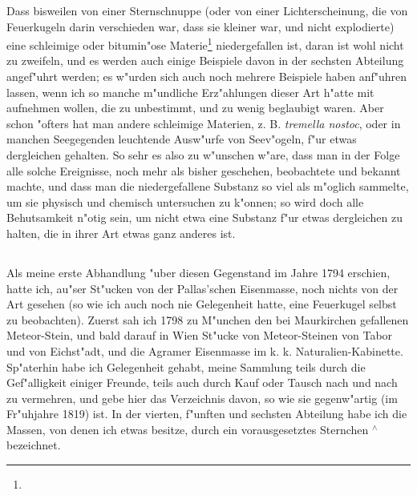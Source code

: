 \documentclass[a4paper, 11pt, oneside, polutonikogreek, german]{article}
\begin{document}
Dass bisweilen von einer Sternschnuppe (oder von einer Lichterscheinung, die von Feuerkugeln darin verschieden war, dass sie kleiner war, und nicht explodierte) eine schleimige oder bitumin"ose Materie\footnote{} niedergefallen ist, daran ist wohl nicht zu zweifeln, und es werden auch einige Beispiele davon in der sechsten Abteilung angef"uhrt werden; es w"urden sich auch noch mehrere Beispiele haben anf"uhren lassen, wenn ich so manche m"undliche Erz"ahlungen dieser Art h"atte mit aufnehmen wollen, die zu unbestimmt, und zu wenig beglaubigt waren. Aber schon "ofters hat man andere schleimige Materien, z. B. \emph{tremella nostoc}, oder in manchen Seegegenden leuchtende Ausw"urfe von Seev"ogeln, f"ur etwas dergleichen gehalten. So sehr es also zu w"unschen w"are, dass man in der Folge alle solche Ereignisse, noch mehr als bisher geschehen, beobachtete und bekannt machte, und dass man die niedergefallene Substanz so viel als m"oglich sammelte, um sie physisch und chemisch untersuchen zu k"onnen; so wird doch alle Behutsamkeit n"otig sein, um nicht etwa eine Substanz f"ur etwas dergleichen zu halten, die in ihrer Art etwas ganz anderes ist.
\subsection{}
\paragraph{}
Als meine erste Abhandlung "uber diesen Gegenstand im Jahre 1794 erschien, hatte ich, au"ser St"ucken von der Pallas'schen Eisenmasse, noch nichts von der Art gesehen (so wie ich auch noch nie Gelegenheit hatte, eine Feuerkugel selbst zu beobachten). Zuerst sah ich 1798 zu M"unchen den bei Maurkirchen gefallenen Meteor-Stein, und bald darauf in Wien St"ucke von Meteor-Steinen von Tabor und von Eichst"adt, und die Agramer Eisenmasse im k. k. Naturalien-Kabinette. Sp"aterhin habe ich Gelegenheit gehabt, meine Sammlung teils durch die Gef"alligkeit einiger Freunde, teils auch durch Kauf oder Tausch nach und nach zu vermehren, und gebe hier das Verzeichnis davon, so wie sie gegenw"artig (im Fr"uhjahre 1819) ist. In der vierten, f"unften und sechsten Abteilung habe ich die Massen, von denen ich etwas besitze, durch ein vorausgesetztes Sternchen $^\wedge$ bezeichnet.
\end{document}
